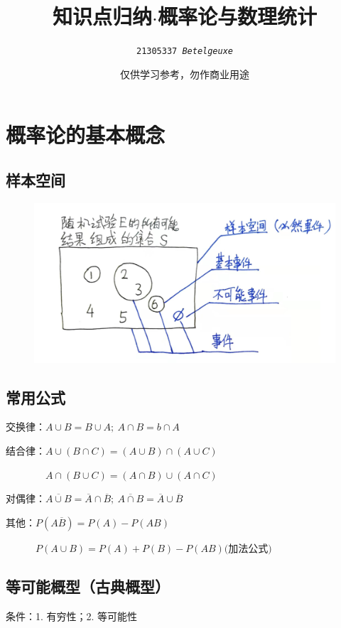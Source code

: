 \documentclass[UTF8]{ctexart}
\title{\zihao{-1}知识点归纳$\cdot$概率论与数理统计}
\author{\tt 21305337 \it  Betelgeuxe}
\date{\kaishu 仅供学习参考，勿作商业用途}
\begin{document}
\everymath{\displaystyle}
\maketitle
\tableofcontents
\newpage
{}
\section{概率论的基本概念}
\subsection{样本空间}
\begin{figure}[H]
    \centering
    \includegraphics[scale=0.24]{样本空间.jpg}
\end{figure}

\subsection{常用公式}


交换律：$A\cup B =B\cup A;\ A\cap B=b\cap A$

结合律：$A\cup(B\cap C)=(A\cup B)\cap(A\cup C)$

$\qquad\qquad A\cap(B\cup C)=(A\cap B)\cup(A\cap C)$

对偶律：$\overline{A\cup B}=\overline A\cap\overline B;\ \overline{A\cap B}=\overline A\cup\overline B$

其他：$P(A\overline B)=P(A)-P(AB)$

$\qquad\quad P(A\cup B)=P(A)+P(B)-P(AB)\text{(加法公式)}$


\subsection{等可能概型（古典概型）}

条件：1. 有穷性；2. 等可能性
\end{document}
